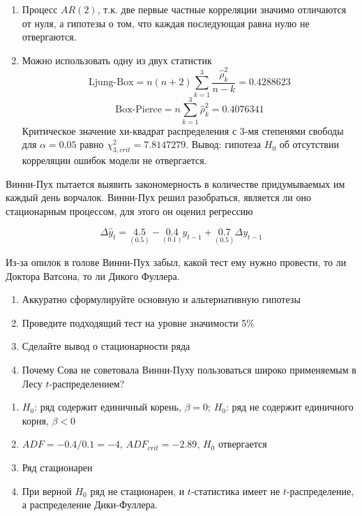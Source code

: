 \documentclass[pdftex,11pt,openany]{book}\usepackage[]{graphicx}\usepackage[]{color}
\begin{document}
\begin{solution}
\begin{enumerate}
\item Процесс $AR(2)$, т.к. две первые частные корреляции значимо отличаются от нуля, а гипотезы о том, что каждая последующая равна нулю не отвергаются.
\item Можно использовать одну из двух статистик
\[
\text{Ljung-Box}=n(n+2)\sum_{k=1}^3\frac{\hat{\rho}_k^2}{n-k}=
0.4288623
\]
\[
\text{Box-Pierce}=n\sum_{k=1}^3\hat{\rho}_k^2=
0.4076341
\]
Критическое значение хи-квадрат распределения с 3-мя степенями свободы для $\alpha=0.05$ равно $\chi^2_{3,crit}=7.8147279$.
Вывод: гипотеза $H_0$ об отсутствии корреляции ошибок модели не отвергается.
\end{enumerate}
\end{solution}





\begin{problem}
Винни-Пух пытается выявить закономерность в количестве придумываемых им каждый день ворчалок.  Винни-Пух решил разобраться, является ли оно стационарным процессом, для этого он оценил регрессию

\[ \Delta \hat{y}_t = \underset{(0.5)}{4.5} - \underset{(0.1)}{0.4}y_{t-1} +\underset{(0.5)}{0.7} \Delta y_{t-1} \]

Из-за опилок в голове Винни-Пух забыл, какой тест ему нужно провести, то ли Доктора Ватсона, то ли Дикого Фуллера. 

\begin{enumerate}
\item Аккуратно сформулируйте основную и альтернативную гипотезы
\item Проведите подходящий тест на уровне значимости 5\%
\item Сделайте вывод о стационарности ряда
\item Почему Сова не советовала Винни-Пуху пользоваться широко применяемым в Лесу $t$-распределением?
\end{enumerate}
\end{problem}

\begin{solution}



\begin{enumerate}
\item $H_0$: ряд содержит единичный корень, $\beta=0$; $H_0$: ряд не содержит единичного корня, $\beta<0$
\item $ADF=-0.4/0.1=-4$, $ADF_{crit}=\ensuremath{-2.89}$, $H_0$ отвергается
\item Ряд стационарен
\item При верной $H_0$ ряд не стационарен, и  $t$-статистика имеет не $t$-распределение, а распределение Дики-Фуллера.
\end{enumerate}
\end{solution}
\end{document}
